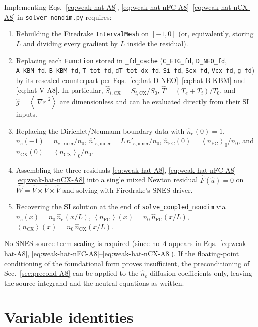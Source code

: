 \documentclass[twocolumn,secnumarabic,amssymb, nobibnotes, aps, prd]{revtex4-2}
\renewcommand{\ne}{n_{e}}  %
\newcommand{\nfc}{n_{\mathrm{FC}}}
\newcommand{\ncx}{n_{\mathrm{CX}}}
\newcommand{\fsa}[1]{\left\langle #1 \right\rangle}
\begin{document}
Implementing Eqs.~\eqref{eq:weak-hat-A8},
\eqref{eq:weak-hat-nFC-A8}--\eqref{eq:weak-hat-nCX-A8} in
\texttt{solver-nondim.py} requires:
\begin{enumerate}
  \item Rebuilding the Firedrake \texttt{IntervalMesh} on $[-1,0]$
    (or, equivalently, storing $L$ and dividing every gradient by $L$
    inside the residual).
  \item Replacing each \texttt{Function} stored in \texttt{\_fd\_cache}
    (\texttt{C\_ETG\_fd}, \texttt{D\_NEO\_fd}, \texttt{A\_KBM\_fd},
    \texttt{B\_KBM\_fd}, \texttt{T\_tot\_fd}, \texttt{dT\_tot\_dx\_fd},
    \texttt{Si\_fd}, \texttt{Scx\_fd}, \texttt{Vcx\_fd}, \texttt{g\_fd})
    by its rescaled counterpart per
    Eqs.~\eqref{eq:hat-D-NEO}--\eqref{eq:hat-B-KBM} and
    \eqref{eq:hat-V-A8}.  In particular,
    $\hat S_{i,\mathrm{CX}} = S_{i,\mathrm{CX}}/S_{0}$,
    $\hat T = (T_{e}+T_{i})/T_{0}$, and $\hat g = \fsa{|\nabla r|^{2}}$
    are dimensionless and can be evaluated directly from their SI
    inputs.
  \item Replacing the Dirichlet/Neumann boundary data with
    $\hat n_{e}(0)=1$,
    $\hat n_{e}(-1)=n_{e,\mathrm{inner}}/n_{0}$,
    $\hat n'_{e,\mathrm{inner}}=L\,n'_{e,\mathrm{inner}}/n_{0}$,
    $\hat n_{\mathrm{FC}}(0)=\fsa{\nfc}_{0}/n_{0}$, and
    $\hat n_{\mathrm{CX}}(0)=\fsa{\ncx}_{0}/n_{0}$.
  \item Assembling the three residuals
    \eqref{eq:weak-hat-A8},
    \eqref{eq:weak-hat-nFC-A8}--\eqref{eq:weak-hat-nCX-A8} into
    a single mixed Newton residual $\hat F(\hat u) = 0$ on
    $\hat W = \hat V \times \hat V \times \hat V$ and solving with
    Firedrake's SNES driver.
  \item Recovering the SI solution at the end of
    \texttt{solve\_coupled\_nondim} via
    $\ne(x)=n_{0}\,\hat n_{e}(x/L)$,
    $\fsa{\nfc}(x)=n_{0}\,\hat n_{\mathrm{FC}}(x/L)$,
    $\fsa{\ncx}(x)=n_{0}\,\hat n_{\mathrm{CX}}(x/L)$.
\end{enumerate}
No SNES source-term scaling is required (since no $\Lambda$ appears in
Eqs.~\eqref{eq:weak-hat-A8}, \eqref{eq:weak-hat-nFC-A8}--\eqref{eq:weak-hat-nCX-A8}).
If the floating-point conditioning of the foundational form proves
insufficient, the preconditioning of Sec.~\ref{sec:precond-A8} can be
applied to the $\hat n_{e}$ diffusion coefficients only, leaving the
source integrand and the neutral equations as written.



\section{Variable identities}
\label{app:Variables}
\end{document}

